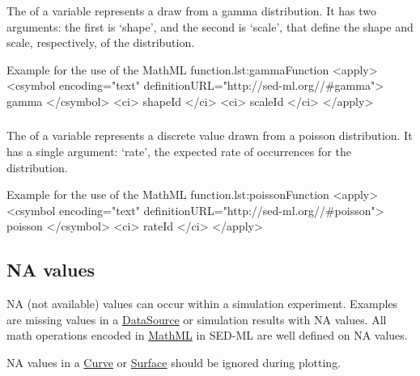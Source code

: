 \begin{blockChanged}

\subsubsection*{}
\label{fun:gamma}
The \sedgamma of a variable represents a draw from a gamma distribution.  It has two arguments:  the first is `shape', and the second is `scale', that define the shape and scale, respectively, of the distribution.
\begin{myXmlLst}{Example for the use of the MathML  function.}{lst:gammaFunction}
<apply>
 	<csymbol encoding="text" definitionURL="http://sed-ml.org//#gamma">
 		gamma
 	</csymbol>
 	<ci> shapeId </ci>
 	<ci> scaleId </ci>
</apply>
\end{myXmlLst}

\subsubsection*{}
\label{fun:poisson}
The \poisson of a variable represents a discrete value drawn from a poisson distribution.  It has a single argument:  `rate', the expected rate of occurrences for the distribution.
\begin{myXmlLst}{Example for the use of the MathML  function.}{lst:poissonFunction}
<apply>
 	<csymbol encoding="text" definitionURL="http://sed-ml.org//#poisson">
 		poisson
 	</csymbol>
 	<ci> rateId </ci>
</apply>
\end{myXmlLst}

\end{blockChanged}



\subsection{NA values}
NA (not available) values can occur within a simulation experiment. Examples are missing values in a \hyperref[class:dataSource]{DataSource} or simulation results with NA values. All math operations encoded in \hyperref[sec:mathML]{MathML} in SED-ML are well defined on NA values. 

NA values in a \hyperref[class:curve]{Curve} or \hyperref[class:surface]{Surface} should be ignored during plotting.
  
